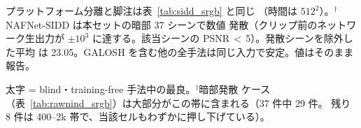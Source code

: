 \begin{table}[t]
\vspace{2pt}
{\footnotesize プラットフォーム分離と脚注は表~\ref{tab:sidd_srgb} と同じ
（時間は $512^2$）。$^{\dagger}$NAFNet-SIDD は本セットの暗部 37 シーンで数値
発散（クリップ前のネットワーク生出力が $\pm10^3$ に達する。該当シーンの
PSNR\,$<$\,5）。発散シーンを除外した平均
は 23.05。GALOSH を含む他の全手法は同じ入力で安定。値はそのまま報告。}
\end{table}

\begin{table}[t]
\centering
\caption{RawNIND sRGB の \textbf{ISO 帯別}平均 PSNR (dB)。低 ISO ではシーンが
ほぼクリーンでどの手法もほとんど改善できない。デノイズが効く高 ISO では、
GALOSH は古典的手法を明確に上回り、学習済み DL は GALOSH をやや上回る。
表~\ref{tab:rawnind_srgb} の集計値はこの両方の効果を隠すため、内訳を報告する。}
\label{tab:rawnind_srgb_iso}
\setlength{\tabcolsep}{5pt}

\vspace{2pt}
{\footnotesize 太字 = blind・training-free 手法中の最良。$^{\dagger}$暗部発散
ケース（表~\ref{tab:rawnind_srgb}）は大部分がこの帯に含まれる（37 件中 29 件。
残り 8 件は 400--2k 帯で、当該セルもわずかに押し下げている）。}
\end{table}
